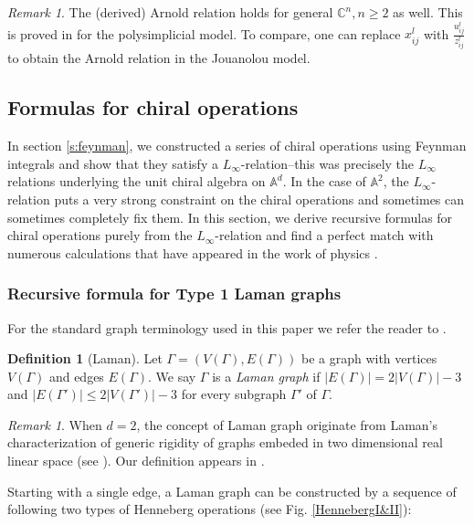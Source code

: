 \documentclass[11pt]{amsart}
\theoremstyle{definition}
\newtheorem{defn}[thm]{Definition}
\theoremstyle{remark}
\newtheorem{rem}[thm]{Remark}
\numberwithin{equation}{section}
\begin{document}
\begin{rem}
  The (derived) Arnold relation holds for general $\mathbb{C}^n,n\geq 2$ as well. This is proved in \cite{FGY} for the polysimplicial model. 
  To compare, one can replace $x^l_{ij}$ with $\frac{u^l_{ij}}{z^l_{ij}}$ to obtain the Arnold relation in the Jouanolou model.
\end{rem}

\subsection{Formulas for chiral operations}


In section \ref{s:feynman}, we constructed a series of chiral operations using Feynman integrals and show that they satisfy a
$L_{\infty}$-relation--this was precisely the $L_\infty$ relations underlying the unit chiral algebra on $\mathbb{A}
^d$.  
In the case of $\mathbb{A}^2$, the $L_{\infty}$-relation puts a very strong constraint on the chiral
operations and sometimes can sometimes completely fix them. In this section, we derive recursive formulas for chiral
operations purely from the $L_{\infty}$-relation and find a perfect match with numerous calculations that have appeared
in the work of physics
\cite{Gaiotto:2024gii}.
\subsubsection{Recursive formula for Type 1 Laman graphs}
For the standard graph terminology used in this paper we refer the reader to \cite{graver1993combinatorial}.

\begin{defn}[Laman]
Let $\Gamma=\left(V(\Gamma),E(\Gamma)\right)$ be a graph with vertices $V(\Gamma)$ and edges $E(\Gamma)$. 
We say $\Gamma$ is a \textit{Laman graph} if $|E(\Gamma)|=2|V(\Gamma)|-3$ and $|E(\Gamma')|\leq 2|V(\Gamma')| -3$ for every subgraph $\Gamma'$ of $\Gamma$.
\end{defn}

\begin{rem}
  When $d = 2$, the concept of Laman graph originate from Laman's
  characterization of generic rigidity of graphs embeded in two dimensional
  real linear space (see {\cite{Laman1970OnGA}}). Our definition appears in
  {\cite{budzik2023feynman}}.
\end{rem}

Starting with a single edge, a Laman graph can be constructed by a sequence of following two types of  Henneberg operations (see Fig. \ref{HennebergI&II}):
\end{document}
